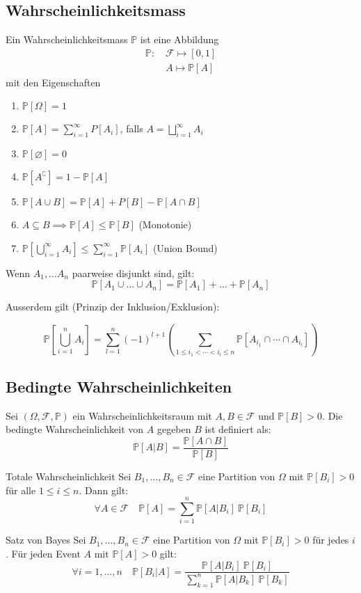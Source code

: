\documentclass[a4paper,10pt]{article}
\def\P{\mathbb{P}}
\def\F{\mathcal{F}}
\begin{document}
\subsection{Wahrscheinlichkeitsmass}
Ein Wahrscheinlichkeitsmass \(\P\) ist eine Abbildung
\begin{align*}
	\P: \  & \F \mapsto \left[0,1\right] \\
	       & A \mapsto \P[A]
\end{align*}
mit den Eigenschaften
\begin{enumerate}
	\item \(\P[\Omega] = 1\)
	\item \(\P [A] = \sum_{i=1}^\infty P[A_i]\), falls \(A = \bigsqcup_{i=1}^\infty A_i\)
	\item \(\P[\varnothing] = 0\)
	\item \(\P[A^\complement] = 1 - \P[A]\)
	\item \(\P[A \cup B] = \P[A] + P[B] - \P[A\cap B]\)
	\item \(A \subseteq B \implies \P[A] \le \P[B]\) (Monotonie)
	\item \(\P[\bigcup_{i=1}^\infty A_i] \le \sum_{i=1}^\infty \P[A_i]\) (Union Bound)
\end{enumerate}

Wenn \(A_1, \ldots A_n\) paarweise disjunkt sind, gilt:
\[\P[A_1 \cup \ldots \cup A_n] = \P[A_1] + \ldots + \P[A_n]\]

Ausserdem gilt (Prinzip der Inklusion/Exklusion):

$$
\P \left[ \bigcup_{i=1}^n A_i \right] = \sum_{l=1}^n (-1)^{l+1} \left( \sum_{1 \leq i_1 < \cdots < i_l \leq n} \P \left[ A_{i_1} \cap \cdots \cap A_{i_l} \right] \right)
$$

\subsection{Bedingte Wahrscheinlichkeiten}
Sei \((\Omega, \F, \P)\) ein Wahrscheinlichkeitsraum mit \(A, B \in \F\) und \(\P[B] > 0\). Die bedingte Wahrscheinlichkeit von \(A\) gegeben \(B\) ist definiert als:
\[\P[A|B] = \frac{\P[A\cap B]}{\P[B]}\]
\begin{subbox}{Totale Wahrscheinlichkeit}
	Sei \(B_1, \ldots, B_n \in \F\) eine Partition von \(\Omega\) mit \(\P[B_i] > 0\) für alle \(1 \le i \le n\). Dann gilt:
	\[\forall A \in \F \quad \P[A] = \sum_{i=1}^{n} \P[A|B_i] \ \P[B_i]\]
\end{subbox}
\begin{mainbox}{Satz von Bayes}
	Sei \(B_1, \ldots, B_n \in \F\) eine Partition von \(\Omega\) mit \(\P[B_i] > 0\) für jedes \(i\). Für jeden Event \(A\) mit \(\P[A] > 0\) gilt:
	\[\forall i = 1,\ldots, n \quad \P[B_i|A] = \frac{\P[A|B_i] \ \P[B_i]}{\sum_{k=1}^n \P[A|B_k] \ \P[B_k]}\]
\end{mainbox}
\end{document}
